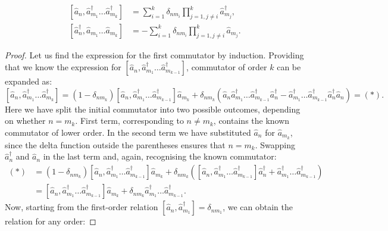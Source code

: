 \begin{lemma}
\label{lmm:formalism:mm-aux:high-order-commutators}
\begin{equation*}
\begin{split}
	[ \hat{a}_n, \hat{a}_{m_1}^\dagger \ldots \hat{a}_{m_k}^\dagger ]
	& = \sum_{i=1}^k \delta_{n m_i}
		\prod_{j=1,j \ne i}^k \hat{a}_{m_j}^\dagger, \\
	[ \hat{a}_n^\dagger, \hat{a}_{m_1} \ldots \hat{a}_{m_k} ]
	& = - \sum_{i=1}^k \delta_{n m_i}
		\prod_{j=1,j \ne i}^k \hat{a}_{m_j}.
\end{split}
\end{equation*}
\end{lemma}
\begin{proof}
Let us find the expression for the first commutator by induction.
Providing that we know the expression for $[ \hat{a}_n, \hat{a}_{m_1}^\dagger \ldots \hat{a}_{m_{k-1}}^\dagger ]$,
commutator of order $k$ can be expanded as:
\[
	[ \hat{a}_n, \hat{a}_{m_1}^\dagger \ldots \hat{a}_{m_k}^\dagger ]
	= (1 - \delta_{n m_k})
		[ \hat{a}_n, \hat{a}_{m_1}^\dagger \ldots \hat{a}_{m_{k-1}}^\dagger ] \hat{a}_{m_k}
	+ \delta_{n m_k} (
		\hat{a}_n \hat{a}_{m_1}^\dagger \ldots \hat{a}_{m_{k-1}}^\dagger \hat{a}_n^\dagger
		- \hat{a}_{m_1}^\dagger \ldots \hat{a}_{m_{k-1}}^\dagger \hat{a}_n^\dagger \hat{a}_n
	)
	= (*).
\]
Here we have split the initial commutator into two possible outcomes, depending on whether $n = m_k$.
First term, corresponding to $n \ne m_k$, contains the known commutator of lower order.
In the second term we have substituted $\hat{a}_n$ for $\hat{a}_{m_k}$,
since the delta function outside the parentheses ensures that $n = m_k$.
Swapping $\hat{a}_n^\dagger$ and $\hat{a}_n$ in the last term and, again, recognising the known commutator:
\begin{equation*}
\begin{split}
	(*)
	& = (1 - \delta_{n m_k})
		[ \hat{a}_n, \hat{a}_{m_1}^\dagger \ldots \hat{a}_{m_{k-1}}^\dagger ] \hat{a}_{m_k}
	+ \delta_{n m_k} (
		[ \hat{a}_n, \hat{a}_{m_1}^\dagger \ldots \hat{a}_{m_{k-1}}^\dagger ] \hat{a}_n^\dagger
		+ \hat{a}_{m_1}^\dagger \ldots \hat{a}_{m_{k-1}}^\dagger
	) \\
	& = [ \hat{a}_n, \hat{a}_{m_1}^\dagger \ldots \hat{a}_{m_{k-1}}^\dagger ] \hat{a}_{m_k}
	+ \delta_{n m_k} \hat{a}_{m_1}^\dagger \ldots \hat{a}_{m_{k-1}}^\dagger.
\end{split}
\end{equation*}
Now, starting from the first-order relation $[ \hat{a}_n, \hat{a}_{m_1}^\dagger ] = \delta_{n m_1}$, we can obtain the relation for any order:

\end{proof}

